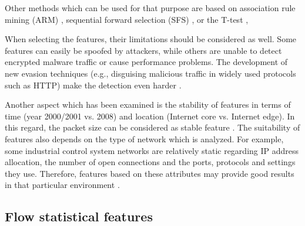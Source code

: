 \documentclass[conference]{IEEEtran}
\begin{document}
Other methods which can be used for that purpose are based on association rule mining (ARM) \cite{moustafa2015}, sequential forward selection (SFS) \cite{dehghani2010} \cite{xu2015}, or the T-test \cite{sopuru2019}, 

When selecting the features, their limitations should be considered as well. Some features can easily be spoofed by attackers, while others are unable to detect encrypted malware traffic or cause performance problems. The development of new evasion techniques (e.g., disguising malicious traffic in widely used protocols such as HTTP) make the detection even harder \cite{celik2015}.

Another aspect which has been examined is the stability of features in terms of time (year 2000/2001 vs. 2008) and location (Internet core vs. Internet edge). In this regard, the packet size can be considered as stable feature \cite{este2009}. The suitability of features also depends on the type of network which is analyzed. For example, some industrial control system networks are relatively static regarding IP address allocation, the number of open connections and the ports, protocols and settings they use. Therefore, features based on these attributes may provide good results in that particular environment \cite{mantere2013}.

\subsection{Flow statistical features}
\end{document}
